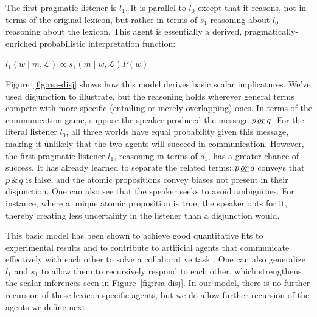 \documentclass[12pt,twoside]{article}
\newcommand{\Figref}[1]{Figure~\ref{#1}}
\newcommand{\figref}[1]{Figure~\ref{#1}}
\newcommand{\word}[1]{\emph{#1}}
\newcommand{\given}{\mid}
\newcommand{\state}{w}
\newcommand{\Lex}{\mathcal{L}}
\newcommand{\msg}{m}
\newcommand{\Prior}{P}
\newcommand{\listenerZero}{l_{0}}
\newcommand{\speakerOne}{s_{1}}
\newcommand{\listenerOne}{l_{1}}
\newcommand{\porq}{p\,\word{or}\,q}
\newcommand{\pandq}{p\,\&\,q}
\renewcommand{\_}{\textbf{\textunderscore\hspace{-4pt}\textunderscore\hspace{-3pt}\textunderscore\hspace{-4pt}\textunderscore}\hspace{0.5pt}}			%
\begin{document}
The first pragmatic listener is $\listenerOne$. It is parallel to
$\listenerZero$ except that it reasons, not in terms of the original
lexicon, but rather in terms of $\speakerOne$ reasoning about
$\listenerZero$ reasoning about the lexicon. This agent is essentially
a derived, pragmatically-enriched probabilistic interpretation
function:
%
\begin{exe}
\ex\label{l1} $\listenerOne(\state \given \msg, \Lex) \propto \speakerOne(\msg \given \state, \Lex) \Prior(\state)$
\end{exe}

\Figref{fig:rsa-disj} shows how this model derives basic scalar
implicatures. We've used disjunction to illustrate, but the reasoning
holds wherever general terms compete with more specific (entailing or
merely overlapping) ones. In terms of the communication game, suppose
the speaker produced the message $\porq$. For the literal listener
$\listenerZero$, all three worlds have equal probability given this
message, making it unlikely that the two agents will succeed in
communication. However, the first pragmatic listener $\listenerOne$,
reasoning in terms of $\speakerOne$, has a greater chance of success.
It has already learned to separate the related terms: $\porq$ conveys
that $\pandq$ is false, and the atomic propositions convey biases not
present in their disjunction. One can also see that the speaker seeks
to avoid ambiguities. For instance, where a unique atomic proposition
is true, the speaker opts for it, thereby creating less uncertainty in
the listener than a disjunction would.

This basic model has been shown to achieve good quantitative fits to
experimental results
\citep{Degen:Franke:2012,Stiller:Goodman:Frank:2011} and to contribute
to artificial agents that communicate effectively with each other to
solve a collaborative task \citep{Vogel-etal:2013}. One can also
generalize $\listenerOne$ and $\speakerOne$ to allow them to
recursively respond to each other, which strengthens the scalar
inferences seen in \figref{fig:rsa-disj}. In our model, there is no
further recursion of these lexicon-specific agents, but we do allow
further recursion of the agents we define next.
\end{document}
